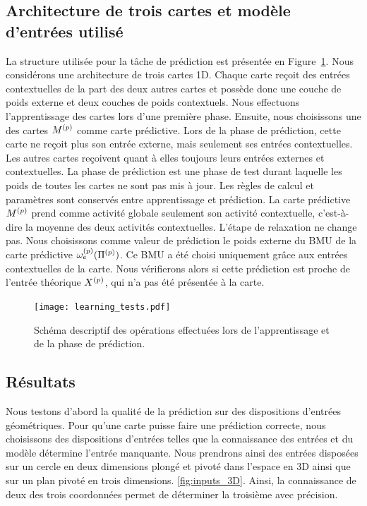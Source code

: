\documentclass[../main]{subfiles}
\begin{document}
\subsection{Architecture de trois cartes et modèle d'entrées utilisé}

La structure utilisée pour la tâche de prédiction est présentée en Figure~\ref{fig:schema_pred}. Nous considérons une architecture de trois cartes 1D. Chaque carte reçoit des entrées contextuelles de la part des deux autres cartes et possède donc une couche de poids externe et deux couches de poids contextuels.
Nous effectuons l'apprentissage des cartes lors d'une première phase.
Ensuite, nous choisissons une des cartes $M^{({p})}$ comme carte prédictive. Lors de la phase de prédiction, cette carte ne reçoit plus son entrée externe, mais seulement ses entrées contextuelles. 
Les autres cartes reçoivent quant à elles toujours leurs entrées externes et contextuelles. 
La phase de prédiction est une phase de test durant laquelle les poids de toutes les cartes ne sont pas mis à jour. Les règles de calcul et paramètres sont conservés entre apprentissage et prédiction.
La carte prédictive $M^{({p})}$ prend comme activité globale seulement son activité contextuelle, c'est-à-dire la moyenne des deux activités contextuelles. L'étape de relaxation ne change pas.
Nous choisissons comme valeur de prédiction le poids externe du BMU de la carte prédictive $\omega_{e}^{({p})}(\Pi^{({p})})$. 
Ce BMU a été choisi uniquement grâce aux entrées contextuelles de la carte. 
Nous vérifierons alors si cette prédiction est proche de l'entrée théorique $X^{({p})}$, qui n'a pas été présentée à la carte.

\begin{figure}
	\texttt{[image: learning\_tests.pdf]}
	\caption{Schéma descriptif des opérations effectuées lors de l'apprentissage et de la phase de prédiction.\label{fig:schema_pred}}
\end{figure}

\subsection{Résultats}

Nous testons d'abord la qualité de la prédiction sur des dispositions d'entrées géométriques.
Pour qu'une carte puisse faire une prédiction correcte, nous choisissons des dispositions d'entrées telles que la connaissance des entrées et du modèle détermine l'entrée manquante.
Nous prendrons ainsi des entrées disposées sur un cercle en deux dimensions plongé et pivoté dans l'espace en 3D ainsi que sur un plan pivoté en trois dimensions. \ref{fig:inputs_3D}. Ainsi, la connaissance de deux des trois coordonnées permet de déterminer la troisième avec précision.
\end{document}
